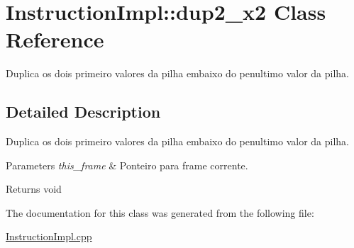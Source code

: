 \hypertarget{class_instruction_impl_1_1dup2__x2}{}\section{Instruction\+Impl\+:\+:dup2\+\_\+x2 Class Reference}
\label{class_instruction_impl_1_1dup2__x2}


Duplica os dois primeiro valores da pilha embaixo do penultimo valor da pilha.  




\subsection{Detailed Description}
Duplica os dois primeiro valores da pilha embaixo do penultimo valor da pilha. 


\begin{DoxyParams}{Parameters}
{\em this\+\_\+frame} & Ponteiro para frame corrente. \\
\hline
\end{DoxyParams}
\begin{DoxyReturn}{Returns}
void 
\end{DoxyReturn}


The documentation for this class was generated from the following file\+:\begin{DoxyCompactItemize}
\item 
\hyperlink{_instruction_impl_8cpp}{Instruction\+Impl.\+cpp}\end{DoxyCompactItemize}
